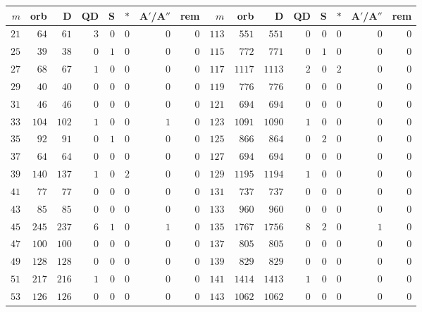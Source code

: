 \documentclass[11pt]{amsart}
\theoremstyle{remark}
\begin{document}
\begin{center}\scriptsize
\setlength{\tabcolsep}{3pt}
\begin{tabular}{rrrrrrrr|rrrrrrrr}
\toprule
$m$ & orb & D & QD & S & $*$ & A$'$/A$''$ & rem & $m$ & orb & D & QD & S & $*$ & A$'$/A$''$ & rem \\
\midrule
$21$ & $64$ & $61$ & $3$ & $0$ & $0$ & $0$ & $0$ & $113$ & $551$ & $551$ & $0$ & $0$ & $0$ & $0$ & $0$ \\
$25$ & $39$ & $38$ & $0$ & $1$ & $0$ & $0$ & $0$ & $115$ & $772$ & $771$ & $0$ & $1$ & $0$ & $0$ & $0$ \\
$27$ & $68$ & $67$ & $1$ & $0$ & $0$ & $0$ & $0$ & $117$ & $1117$ & $1113$ & $2$ & $0$ & $2$ & $0$ & $0$ \\
$29$ & $40$ & $40$ & $0$ & $0$ & $0$ & $0$ & $0$ & $119$ & $776$ & $776$ & $0$ & $0$ & $0$ & $0$ & $0$ \\
$31$ & $46$ & $46$ & $0$ & $0$ & $0$ & $0$ & $0$ & $121$ & $694$ & $694$ & $0$ & $0$ & $0$ & $0$ & $0$ \\
$33$ & $104$ & $102$ & $1$ & $0$ & $0$ & $1$ & $0$ & $123$ & $1091$ & $1090$ & $1$ & $0$ & $0$ & $0$ & $0$ \\
$35$ & $92$ & $91$ & $0$ & $1$ & $0$ & $0$ & $0$ & $125$ & $866$ & $864$ & $0$ & $2$ & $0$ & $0$ & $0$ \\
$37$ & $64$ & $64$ & $0$ & $0$ & $0$ & $0$ & $0$ & $127$ & $694$ & $694$ & $0$ & $0$ & $0$ & $0$ & $0$ \\
$39$ & $140$ & $137$ & $1$ & $0$ & $2$ & $0$ & $0$ & $129$ & $1195$ & $1194$ & $1$ & $0$ & $0$ & $0$ & $0$ \\
$41$ & $77$ & $77$ & $0$ & $0$ & $0$ & $0$ & $0$ & $131$ & $737$ & $737$ & $0$ & $0$ & $0$ & $0$ & $0$ \\
$43$ & $85$ & $85$ & $0$ & $0$ & $0$ & $0$ & $0$ & $133$ & $960$ & $960$ & $0$ & $0$ & $0$ & $0$ & $0$ \\
$45$ & $245$ & $237$ & $6$ & $1$ & $0$ & $1$ & $0$ & $135$ & $1767$ & $1756$ & $8$ & $2$ & $0$ & $1$ & $0$ \\
$47$ & $100$ & $100$ & $0$ & $0$ & $0$ & $0$ & $0$ & $137$ & $805$ & $805$ & $0$ & $0$ & $0$ & $0$ & $0$ \\
$49$ & $128$ & $128$ & $0$ & $0$ & $0$ & $0$ & $0$ & $139$ & $829$ & $829$ & $0$ & $0$ & $0$ & $0$ & $0$ \\
$51$ & $217$ & $216$ & $1$ & $0$ & $0$ & $0$ & $0$ & $141$ & $1414$ & $1413$ & $1$ & $0$ & $0$ & $0$ & $0$ \\
$53$ & $126$ & $126$ & $0$ & $0$ & $0$ & $0$ & $0$ & $143$ & $1062$ & $1062$ & $0$ & $0$ & $0$ & $0$ & $0$ \\

\end{tabular}
\end{center}
\end{document}
